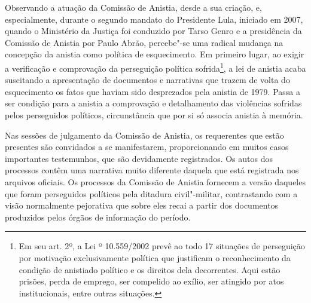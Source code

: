 Observando a atuação da Comissão de Anistia, desde a sua criação, e,
especialmente, durante o segundo mandato do Presidente Lula, iniciado em
2007, quando o Ministério da Justiça foi conduzido por Tarso Genro e a
presidência da Comissão de Anistia por Paulo Abrão, percebe"-se uma
radical mudança na concepção da anistia como política de esquecimento.
Em primeiro lugar, ao exigir a verificação e comprovação da perseguição
política sofrida\footnote{Em seu art. 2º, a Lei º 10.559/2002 prevê ao
  todo 17 situações de perseguição por motivação exclusivamente política
  que justificam o reconhecimento da condição de anistiado político e os
  direitos dela decorrentes. Aqui estão prisões, perda de emprego, ser
  compelido ao exílio, ser atingido por atos institucionais, entre
  outras situações.}, a lei de anistia acaba suscitando a apresentação
de documentos e narrativas que trazem de volta do esquecimento os fatos
que haviam sido desprezados pela anistia de 1979. Passa a ser condição
para a anistia a comprovação e detalhamento das violências sofridas
pelos perseguidos políticos, circunstância que por si só associa anistia
à memória.

Nas sessões de julgamento da Comissão de Anistia, os requerentes que
estão presentes são convidados a se manifestarem, proporcionando em
muitos casos importantes testemunhos, que são devidamente registrados.
Os autos dos processos contêm uma narrativa muito diferente daquela que
está registrada nos arquivos oficiais. Os processos da Comissão de
Anistia fornecem a versão daqueles que foram perseguidos políticos pela
ditadura civil"-militar, contrastando com a visão normalmente pejorativa
que sobre eles recai a partir dos documentos produzidos pelos órgãos de
informação do período.

